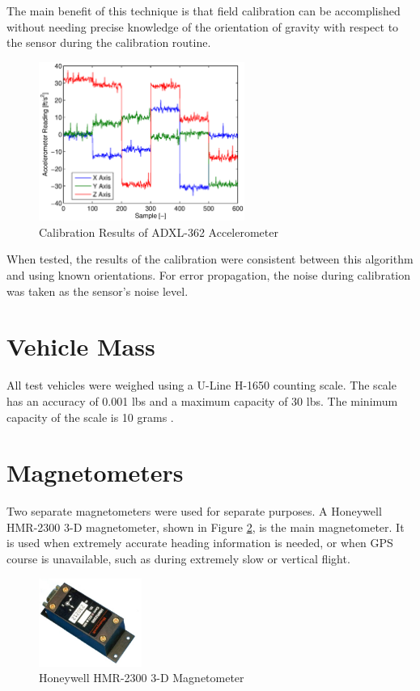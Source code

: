 The main benefit of this technique is that field calibration can be accomplished without needing precise knowledge of the orientation of gravity with respect to the sensor during the calibration routine. 
\begin{figure}[H]
  \centering
    \includegraphics[width=0.6\textwidth]{figures/accelCalib.eps}
      \caption{Calibration Results of ADXL-362 Accelerometer}
      \label{fig:accelCalib}
\end{figure}
When tested, the results of the calibration were consistent between this algorithm and using known orientations. For error propagation, the noise during calibration was taken as the sensor's noise level.

\section{Vehicle Mass}
All test vehicles were weighed using a U-Line H-1650 counting scale. The scale has an accuracy of 0.001 lbs and a maximum capacity of 30 lbs. The minimum capacity of the scale is 10 grams \cite{U-Line}.

\section{Magnetometers}
Two separate magnetometers were used for separate purposes. A Honeywell HMR-2300 3-D magnetometer, shown in Figure \ref{hmr23000Picture}, is the main magnetometer. It is used when extremely accurate heading information is needed, or when GPS course is unavailable, such as during extremely slow or vertical flight.

\begin{figure}[H]
  \centering
    \includegraphics[width=0.3\textwidth]{figures/hmr2300.jpg}
      \caption{Honeywell HMR-2300 3-D Magnetometer }
      \label{hmr23000Picture}
\end{figure}

